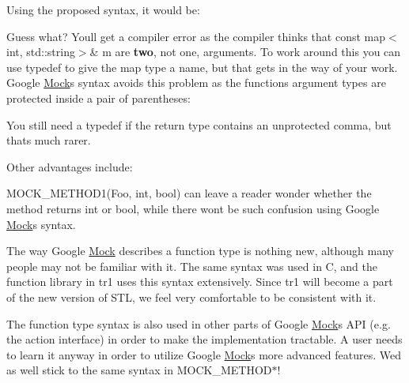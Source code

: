 Using the proposed syntax, it would be\+: 
\begin{DoxyCode}{0}
\end{DoxyCode}


Guess what? You\textquotesingle{}ll get a compiler error as the compiler thinks that {\ttfamily const map$<$int, std\+::string$>$\& m} are {\bfseries{two}}, not one, arguments. To work around this you can use {\ttfamily typedef} to give the map type a name, but that gets in the way of your work. Google \mbox{\hyperlink{class_mock}{Mock}}\textquotesingle{}s syntax avoids this problem as the function\textquotesingle{}s argument types are protected inside a pair of parentheses\+: 
\begin{DoxyCode}{0}
\end{DoxyCode}


You still need a {\ttfamily typedef} if the return type contains an unprotected comma, but that\textquotesingle{}s much rarer.

Other advantages include\+:
\begin{DoxyEnumerate}
\item {\ttfamily M\+O\+C\+K\+\_\+\+M\+E\+T\+H\+O\+D1(\+Foo, int, bool)} can leave a reader wonder whether the method returns {\ttfamily int} or {\ttfamily bool}, while there won\textquotesingle{}t be such confusion using Google \mbox{\hyperlink{class_mock}{Mock}}\textquotesingle{}s syntax.
\end{DoxyEnumerate}
\begin{DoxyEnumerate}
\item The way Google \mbox{\hyperlink{class_mock}{Mock}} describes a function type is nothing new, although many people may not be familiar with it. The same syntax was used in C, and the {\ttfamily function} library in {\ttfamily tr1} uses this syntax extensively. Since {\ttfamily tr1} will become a part of the new version of S\+TL, we feel very comfortable to be consistent with it.
\end{DoxyEnumerate}
\begin{DoxyEnumerate}
\item The function type syntax is also used in other parts of Google \mbox{\hyperlink{class_mock}{Mock}}\textquotesingle{}s A\+PI (e.\+g. the action interface) in order to make the implementation tractable. A user needs to learn it anyway in order to utilize Google \mbox{\hyperlink{class_mock}{Mock}}\textquotesingle{}s more advanced features. We\textquotesingle{}d as well stick to the same syntax in {\ttfamily M\+O\+C\+K\+\_\+\+M\+E\+T\+H\+O\+D$\ast$}!
\end{DoxyEnumerate}

